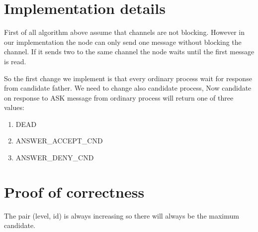 \documentclass{article}
\begin{document}
\section*{Implementation details}
First of all algorithm above assume that channels are not blocking. However in our implementation the node can only send one message without blocking the channel. If it sends two to the same channel the node waits until the first message is read.

So the first change we implement is that every ordinary process wait for response from candidate father. We need to change also candidate process, Now candidate on response to ASK message from ordinary process will return one of three values:
\begin{enumerate}
    \item DEAD 
    \item ANSWER\_ACCEPT\_CND 
    \item ANSWER\_DENY\_CND
\end{enumerate}

\section*{Proof of correctness}
The pair (level, id) is always increasing so there will always be the maximum candidate.
\end{document}
